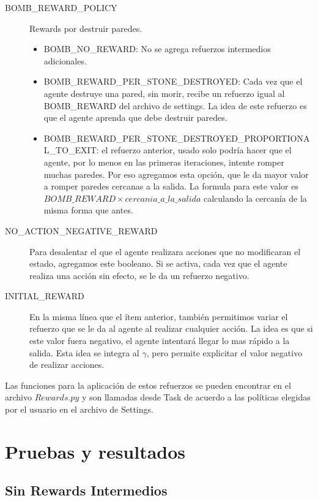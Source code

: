 \documentclass[a4paper,spanish] {article}
\begin{document}
\begin{description}
\item[BOMB\_REWARD\_POLICY] Rewards por destruir paredes.
	\begin{itemize}
	\item BOMB\_NO\_REWARD: No se agrega refuerzos intermedios adicionales.
	\item BOMB\_REWARD\_PER\_STONE\_DESTROYED: Cada vez que el agente destruye una pared, sin morir, recibe un refuerzo igual al BOMB\_REWARD del archivo de settings. La idea de este refuerzo es que el agente aprenda que debe destruir paredes.
	\item BOMB\_REWARD\_PER\_STONE\_DESTROYED\_PROPORTIONAL\_TO\_EXIT: el refuerzo anterior, usado solo podr\'ia hacer que el agente, por lo menos en las primeras iteraciones, intente romper muchas paredes. Por eso agregamos esta opci\'on, que le da mayor valor a romper paredes cercanas a la salida. La formula para este valor es $BOMB\_REWARD \times cercania\_a\_la\_salida$ calculando la cercan\'ia de la misma forma que antes.
	\end{itemize}

	
\item[NO\_ACTION\_NEGATIVE\_REWARD] Para desalentar el que el agente realizara acciones que no modificaran el estado, agregamos este booleano. Si se activa, cada vez que el agente realiza una acci\'on sin efecto, se le da un refuerzo negativo. 

\item[INITIAL\_REWARD] En la misma l\'inea que el \'item anterior, tambi\'en permitimos variar el refuerzo que se le da al agente al realizar cualquier acci\'on. La idea es que si este valor fuera negativo, el agente intentar\'a llegar lo mas r\'apido a la salida. Esta idea se integra al $\gamma$, pero permite explicitar el valor negativo de realizar acciones.

\end{description}

	Las funciones para la aplicaci\'on de estos refuerzos se pueden encontrar en el archivo $Rewards.py$ y son llamadas desde Task de acuerdo a las pol\'iticas elegidas por el usuario en el archivo de Settings.
 
\section{Pruebas y resultados}
	\subsection{Sin Rewards Intermedios}
\end{document}
